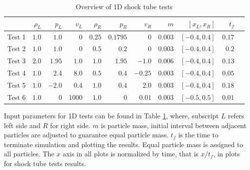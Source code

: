 \documentclass[review]{elsarticle}
\begin{document}
\begin{table}[htp]
\centering
      \caption{Overview of 1D shock tube tests}		
	  \begin{tabular}{lrrrrrrrrrr}
	    \hline
	          & $\rho_L$ & $p_L$ &$v_L$ & $\rho_R$ & $p_R$ &$v_R$ & $m$ & $[x_L, x_R]$ & $t_f$\\
	    \hline
	    Test 1 & $1.0$ & $1.0$ &$0$ & $0.25$ & $0.1795$ &$0$ & $0.003$  & $[-0.4, 0.4]$ & $0.17$\\
	    	Test 2 & $1.0$ & $1.0$ &$0$ & $0.5$ & $0.2$ &$0$ & $0.003$  & $[-0.4, 0.4]$ & $0.2$\\
	    	Test 3 & $2.0$ & $1.95$ &$1.0$ & $1.0$ & $1.95$ &$-1.0$  & $0.006$  & $[-0.4, 0.4]$ & $0.13$\\
	    Test 4 & $1.0$ & $2.4$ &$8.0$ & $0.5$ & $0.4$ &$-0.25$ & $0.003$  & $[-0.4, 0.4]$ & $0.05$\\
	    	Test 5 & $1.0$ & $-2.0$ &$0.4$ & $1.0$ & $0.4$ &$2.0$ & $0.003$  & $[-0.4, 0.4]$ & $0.18$\\
	    	Test 6 & $1.0$ & $0$ &$1000$ & $1.0$ & $0$ &$0.01$ & $0.003$  & $[-0.5, 0.5]$  & $0.01$\\
	    \hline
	  \end{tabular}
	  \label{tab:1D-shock-input_parameters}
\end{table}
Input parameters for 1D tests can be found in Table \ref{tab:1D-shock-input_parameters}, where, subscript $L$ refers left side and $R$ for right side. $m$ is particle mass, initial interval between adjacent particles are adjusted to guarantee equal particle mass. $t_f$ is the time to terminate simulation and plotting the results. Equal particle mass is assigned to all particles. The $x$ axis in all plots is normalized by time, that is $x/t_f$, in plots for shock tube tests results.
\end{document}
